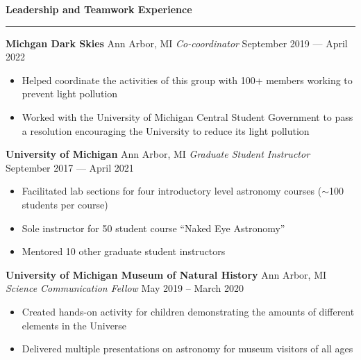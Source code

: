 \documentclass[10pt]{article}
\newcommand{\header}[1]{\vspace{1.0em}\par \textbf{\large #1}\strut\hrule\vspace{-1.2em}}
\newcommand{\actionHeader}[2]{\vspace{1em}\textbf{#1} \hfill #2}
\newcommand{\actionHeaderSecondLine}[2]{\newline \textit{#1} \hfill #2}
\begin{document}
\header{Leadership and Teamwork Experience}
\actionHeader{Michgan Dark Skies}{Ann Arbor, MI}
\actionHeaderSecondLine{Co-coordinator}{September 2019 --- April 2022}
\begin{itemize}
    \item Helped coordinate the activities of this group with 100+ members working to prevent light pollution
    \item Worked with the University of Michigan Central Student Government to pass a resolution encouraging the University to reduce its light pollution
\end{itemize}

\actionHeader{University of Michigan}{Ann Arbor, MI}
\actionHeaderSecondLine{Graduate Student Instructor}{September 2017 --- April 2021}
\begin{itemize}
    \item Facilitated lab sections for four introductory level astronomy courses ($\sim$100 students per course)
    \item Sole instructor for 50 student course ``Naked Eye Astronomy''
    \item Mentored 10 other graduate student instructors 
\end{itemize}


\actionHeader{University of Michigan Museum of Natural History}{Ann Arbor, MI}
\actionHeaderSecondLine{Science Communication Fellow}{May 2019 -- March 2020}
\begin{itemize}
    \item Created hands-on activity for children demonstrating the amounts of different elements in the Universe
    \item Delivered multiple presentations on astronomy for museum visitors of all ages
\end{itemize}

\end{document}
